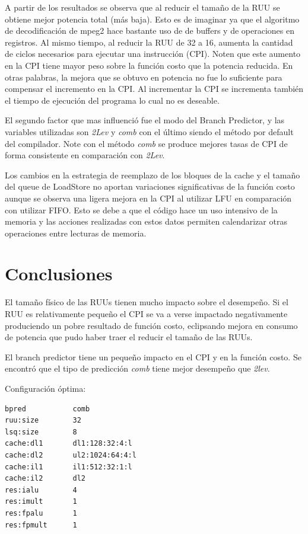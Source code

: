 \documentclass[journal]{IEEEtran}
\begin{document}
A partir de los resultados se observa que al reducir el tama\~{n}o de la RUU se obtiene mejor potencia total (m\'{a}s baja). Esto es de imaginar ya que el algoritmo de decodificaci\'{o}n de mpeg2 hace bastante uso de de buffers y de operaciones en registros. Al mismo tiempo, al reducir la RUU de 32 a 16, aumenta la cantidad de ciclos necesarios para ejecutar una instrucci\'{o}n (CPI). Noten que este aumento en la CPI
tiene mayor peso sobre la funci\'{o}n costo que la potencia reducida. En otras palabras, la mejora que se obtuvo en potencia no fue lo suficiente para compensar el incremento en la CPI. Al incrementar la CPI se incrementa tambi\'{e}n
el tiempo de ejecuci\'{o}n del programa lo cual no es deseable.

El segundo factor que mas influenci\'{o} fue el modo del Branch Predictor, y las variables utilizadas son \textit{2Lev} y \textit{comb} con el \'{u}ltimo siendo el m\'{e}todo por default del compilador. Note con el m\'{e}todo \textit{comb} se produce
mejores tasas de CPI de forma consistente en comparaci\'{o}n con \textit{2Lev}.

Los cambios en la estrategia de reemplazo de los bloques de la cache y el tama\~no del queue de LoadStore no aportan variaciones significativas de la funci\'{o}n costo aunque se observa una ligera mejora en la CPI al utilizar LFU en comparaci\'{o}n con utilizar FIFO. Esto se debe a que el c\'{o}digo hace un uso intensivo de la memoria y las acciones realizadas con estos datos permiten calendarizar otras operaciones entre lecturas de memoria.


\section{Conclusiones}
El tama\~no f\'isico de las RUUs tienen mucho impacto sobre el desempe\~no. Si el RUU es relativamente peque\~no el CPI se va a verse impactado negativamente produciendo un pobre resultado de funci\'on costo, eclipsando
mejora en consumo de potencia que pudo haber traer el reducir el tama\~no de las RUUs.

El branch predictor tiene un peque\~no impacto en el CPI y en la funci\'on costo. Se encontr\'o que el tipo de predicci\'on \textit{comb} tiene mejor desempe\~no que \textit{2lev}. \newline

Configuraci\'on \'optima: \newline

\footnotesize \begin{verbatim}
bpred           comb
ruu:size        32
lsq:size        8
cache:dl1       dl1:128:32:4:l
cache:dl2       ul2:1024:64:4:l
cache:il1       il1:512:32:1:l
cache:il2       dl2
res:ialu        4
res:imult       1
res:fpalu       1
res:fpmult      1
\end{verbatim}
\normalsize
\end{document}
